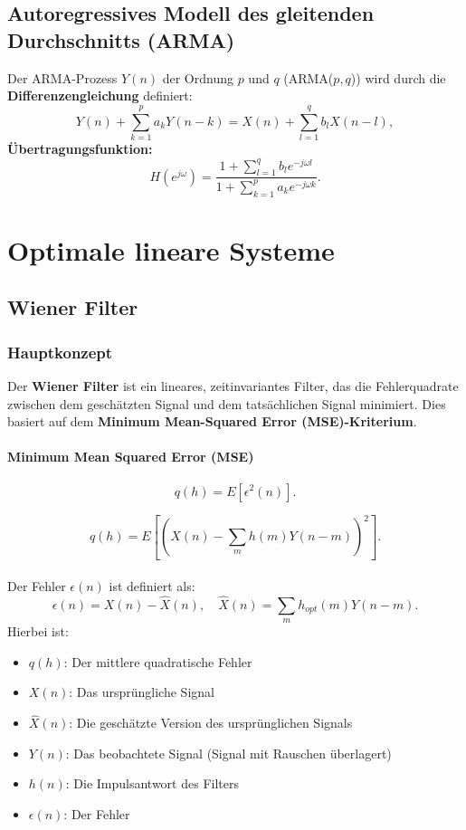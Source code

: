 \documentclass[12pt]{article}
\begin{document}
   \subsection{Autoregressives Modell des gleitenden Durchschnitts (ARMA)}
      Der ARMA-Prozess \(Y(n)\) der Ordnung \(p\) und \(q\) (ARMA(\(p,q\))) wird durch die \textbf{Differenzengleichung} definiert:   %
      \[
         Y(n) + \sum_{k=1}^p a_k Y(n-k) = X(n) + \sum_{l=1}^q b_l X(n-l),
      \]
      \textbf{Übertragungsfunktion:}
      \[
         H(e^{j\omega}) = \frac{1 + \sum_{l=1}^q b_l e^{-j\omega l}}{1 + \sum_{k=1}^p a_k e^{-j\omega k}}.
      \]

\newpage

   \section{Optimale lineare Systeme}

      \subsection{Wiener Filter}
         \subsubsection{Hauptkonzept}
            Der \textbf{Wiener Filter} ist ein lineares, zeitinvariantes Filter, das die Fehlerquadrate zwischen dem geschätzten Signal und dem tatsächlichen Signal minimiert. Dies basiert auf dem \textbf{Minimum Mean-Squared Error (MSE)-Kriterium}.

            \paragraph{Minimum Mean Squared Error (MSE)}
            \[
               q(h) = E\left[ \epsilon^2(n) \right].
            \]

            \[
               q(h) = E\left[\left(X(n) - \sum_{m} h(m)Y(n-m)\right)^2\right].   %
            \]
            \\
            Der Fehler \( \epsilon(n) \) ist definiert als:
            \[
               \epsilon(n) = X(n) - \hat{X}(n), \quad \hat{X}(n) = \sum_{m} h_{opt}(m) Y(n-m).
            \]
            Hierbei ist:
            \begin{itemize}
               \item \( q(h)\): Der mittlere quadratische Fehler
               \item \( X(n) \): Das ursprüngliche Signal
               \item \( \hat{X}(n)\): Die geschätzte Version des ursprünglichen Signals
               \item \( Y(n) \): Das beobachtete Signal (Signal mit Rauschen überlagert)
               \item \( h(n) \): Die Impulsantwort des Filters
               \item \( \epsilon(n) \): Der Fehler
            \end{itemize}
\end{document}
